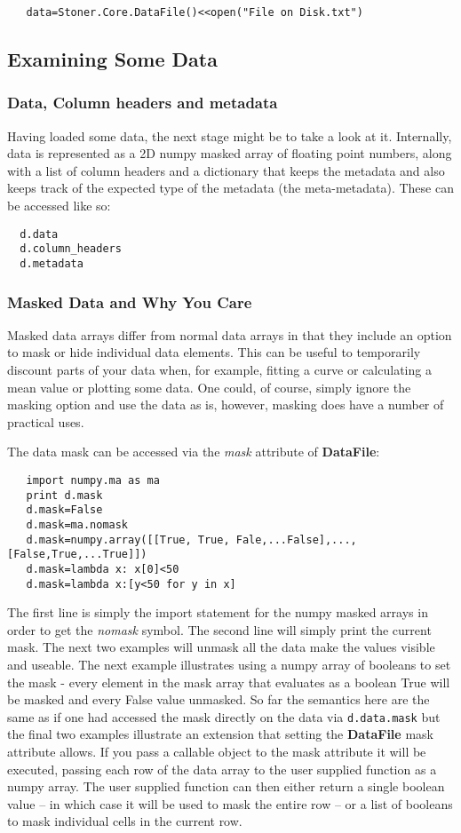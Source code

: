 \documentclass[a4paper,11pt]{scrartcl}
\begin{document}
\begin{lstlisting}
   data=Stoner.Core.DataFile()<<open("File on Disk.txt")
\end{lstlisting}

\subsection{Examining Some Data}
\subsubsection{Data, Column headers and metadata}
Having loaded some data, the next stage might be to take a look at it.
Internally, data is represented as a 2D numpy masked array of floating point numbers,
along with a list of column headers and a dictionary that keeps the metadata and
also keeps track of the expected type of the metadata (\ie the meta-metadata).
These can be accessed like so:
\begin{lstlisting}
  d.data
  d.column_headers
  d.metadata
\end{lstlisting}

\subsubsection{Masked Data and Why You Care}\label{(maskeddata)}
Masked data arrays differ from normal data arrays in that they include an option to mask or hide individual data elements. This can be useful to temporarily discount parts of your data when, for example, fitting a curve or calculating a mean value or plotting some data. One could, of course, simply ignore the masking option and use the data as is, however, masking does have a number of practical uses.

The data mask can be accessed via the \textit{mask} attribute of \textbf{DataFile}:
\begin{lstlisting}
   import numpy.ma as ma
   print d.mask
   d.mask=False
   d.mask=ma.nomask
   d.mask=numpy.array([[True, True, Fale,...False],...,[False,True,...True]])
   d.mask=lambda x: x[0]<50
   d.mask=lambda x:[y<50 for y in x]
\end{lstlisting}

The first line is simply the import statement for the numpy masked arrays in order to get the \textit{nomask} symbol. The second line will simply print the current mask. The next two examples will unmask all the data \ie make the values visible and useable. The next example illustrates using a numpy array of booleans to set the mask - every element in the mask array that evaluates as a boolean True will be masked and every False value unmasked. So far the semantics here are the same as if one had accessed the mask directly on the data via \verb'd.data.mask' but the final two examples illustrate an extension that setting the \textbf{DataFile} mask attribute allows. If you pass a callable object to the mask attribute it will be executed, passing each row of the data array to the user supplied function as a numpy array. The user supplied function can then either return a single boolean value -- in which case it will be used to mask the entire row -- or a list of booleans to mask individual cells in the current row.
\end{document}
